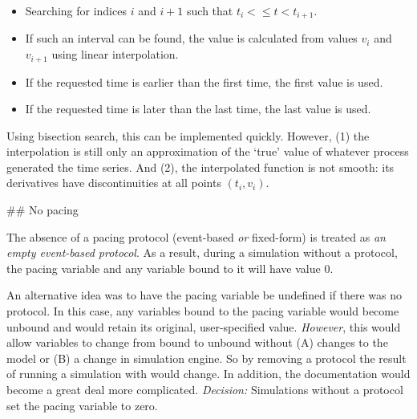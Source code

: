 \begin{itemize}
\item Searching for indices $i$ and $i+1$ such that $t_i <\leq t < t_{i+1}$.
\item If such an interval can be found, the value is calculated from values
 $v_i$ and $v_{i+1}$ using linear interpolation.
\item If the requested time is earlier than the first time, the first value is
 used.
\item If the requested time is later than the last time, the last value is
 used.
\end{itemize}

Using bisection search, this can be implemented quickly.
However, (1) the interpolation is still only an approximation of the `true'
 value of whatever process generated the time series.
And (2), the interpolated function is not smooth: its derivatives have
 discontinuities at all points $(t_i, v_i)$.

## No pacing

The absence of a pacing protocol (event-based \emph{or} fixed-form) is treated
 as \emph{an empty event-based protocol}.
As a result, during a simulation without a protocol, the pacing variable and
 any variable bound to it will have value $0$.

An alternative idea was to have the pacing variable be undefined if there was
 no protocol.
In this case, any variables bound to the pacing variable would become unbound
 and would retain its original, user-specified value.
\emph{However}, this would allow variables to change from bound to unbound
 without (A) changes to the model or (B) a change in simulation engine.
So by removing a protocol the result of running a simulation with
  would change.
In addition, the documentation would become a great deal more complicated.
\emph{Decision:} Simulations without a protocol set the pacing variable to
 zero.

